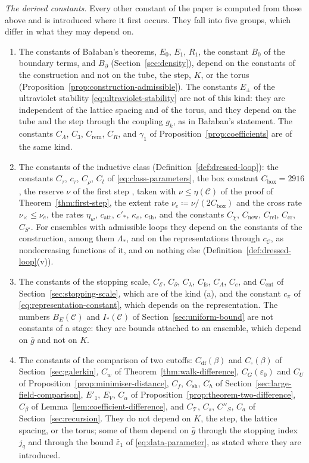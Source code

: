 \documentclass[11pt]{preprint}
\numberwithin{equation}{section}
\theoremstyle{definition}
\theoremstyle{remark}
\theoremstyle{plain}
\begin{document}
\emph{The derived constants.} Every other constant of the paper is computed from those above and is introduced where it first occurs. They fall into five groups, which differ in what they may depend on.
\begin{enumerate}[label=(\alph*)]
\item The constants of Ba{\l}aban's theorems, $E_0$, $E_1$, $R_1$, the constant $B_0$ of the boundary terms, and $B_\partial$ (Section~\ref{sec:density}), depend on the constants of the construction and not on the tube, the step, $K$, or the torus (Proposition~\ref{prop:construction-admissible}). The constants $E_\pm$ of the ultraviolet stability \eqref{eq:ultraviolet-stability} are not of this kind: they are independent of the lattice spacing and of the torus, and they depend on the tube and the step through the coupling $g_k$, as in Ba{\l}aban's statement. The constants $C_\Lambda$, $C_3$, $C_{\mathrm{rem}}$, $C_R$, and $\gamma_1$ of Proposition~\ref{prop:coefficients} are of the same kind.
\item The constants of the inductive class (Definition~\ref{def:dressed-loop}): the constants $C_\tau$, $c_\tau$, $C_\rho$, $C_t$ of \eqref{eq:class-parameters}, the box constant $C_{\mathrm{box}} = 2916$, the reserve $\nu$ of the first step \cite{WilsonFirstStep}, taken with $\nu \leq \eta(\mathcal C)$ of the proof of Theorem~\ref{thm:first-step}, the extent rate $\nu_e \coloneqq \nu/(2C_{\mathrm{box}})$ and the cross rate $\nu_\times \leq \nu_e$, the rates $\eta_w$, $c_{\mathrm{att}}$, $c'_*$, $\kappa_e$, $c_{\mathrm{th}}$, and the constants $C_\chi$, $C_{\mathrm{new}}$, $C_{\mathrm{rel}}$, $C_{\mathrm{cr}}$, $C_{S'}$. For ensembles with admissible loops they depend on the constants of the construction, among them $\Lambda_*$, and on the representations through $c_{\mathcal C}$, as nondecreasing functions of it, and on nothing else (Definition~\ref{def:dressed-loop}(v)).
\item The constants of the stopping scale, $C_{\mathcal E}$, $C_\partial$, $C_\lambda$, $C_{\mathrm{fs}}$, $C_A$, $C_e$, and $C_{\mathrm{ent}}$ of Section~\ref{sec:stopping-scale}, which are of the kind (a), and the constant $c_\pi$ of \eqref{eq:representation-constant}, which depends on the representation. The numbers $B_E(\mathcal C)$ and $I_*(\mathcal C)$ of Section~\ref{sec:uniform-bound} are not constants of a stage: they are bounds attached to an ensemble, which depend on $\bar g$ and not on $K$.
\item The constants of the comparison of two cutoffs: $C_{\mathrm{df}}(\beta)$ and $C_\square(\beta)$ of Section~\ref{sec:galerkin}, $C_w$ of Theorem~\ref{thm:walk-difference}, $C_G(\varepsilon_0)$ and $C_U$ of Proposition~\ref{prop:minimiser-distance}, $C_f$, $C_{\mathrm{sh}}$, $C_h$ of Section~\ref{sec:large-field-comparison}, $E'_1$, $E_V$, $C_\alpha$ of Proposition~\ref{prop:theorem-two-difference}, $C_\beta$ of Lemma~\ref{lem:coefficient-difference}, and $C_{\mathcal T}$, $C_s$, $C''_S$, $C_a$ of Section~\ref{sec:recursion}. They do not depend on $K$, the step, the lattice spacing, or the torus; some of them depend on $\bar g$ through the stopping index $j_q$ and through the bound $\bar\varepsilon_1$ of \eqref{eq:data-parameter}, as stated where they are introduced.

\end{enumerate}
\end{document}
